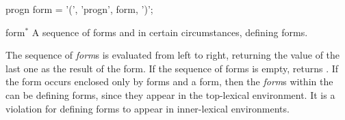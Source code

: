\begin{optDefinition}
%
\Syntax
\savesyntax\prognSyntax\vbox{\small\syntax
progn form
   = '(', 'progn', {form}, ')';
\endsyntax}
%
\begin{arguments}
    \item[form\/$^*$] A sequence of forms and in certain circumstances, defining
    forms.
\end{arguments}
%
\result%
The sequence of {\em form}s is evaluated from left to right, returning the value
of the last one as the result of the  form.  If the sequence
of forms is empty,  returns \nil.
%
\remarks%
If the  form occurs enclosed only by  forms
and a  form, then the {\em form}s within the
 can be defining forms, since they appear in the top-lexical
environment.  It is a violation for defining forms to appear in inner-lexical
environments.

%


\end{optDefinition}
